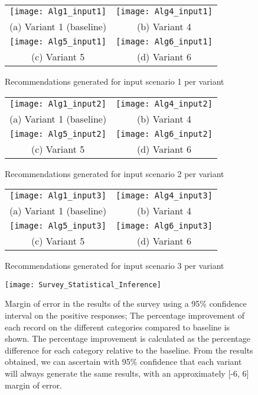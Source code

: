 \begin{figure}
\begin{tabular}{cc}
\texttt{[image: Alg1\_input1]} &  \texttt{[image: Alg4\_input1]} \\
(a) Variant 1 (baseline) & (b) Variant 4 \\[6pt]
 \texttt{[image: Alg5\_input1]} &   \texttt{[image: Alg6\_input1]} \\
(c) Variant 5 & (d) Variant 6 \\[6pt]
\end{tabular}
\caption{Recommendations generated for input scenario 1 per variant}\label{fig:input1_suggestions}
\end{figure}
\begin{figure}
\begin{tabular}{cc}
\texttt{[image: Alg1\_input2]} &  \texttt{[image: Alg4\_input2]} \\
(a) Variant 1 (baseline) & (b) Variant 4 \\[6pt]
 \texttt{[image: Alg5\_input2]} &   \texttt{[image: Alg6\_input2]} \\
(c) Variant 5 & (d) Variant 6 \\[6pt]
\end{tabular}
\caption{Recommendations generated for input scenario 2 per variant}\label{fig:input2_suggestions}
\end{figure}
\begin{figure}
\begin{tabular}{cc}
\texttt{[image: Alg1\_input3]} &  \texttt{[image: Alg4\_input3]} \\
(a) Variant 1 (baseline) & (b) Variant 4 \\[6pt]
 \texttt{[image: Alg5\_input3]} &   \texttt{[image: Alg6\_input3]} \\
(c) Variant 5 & (d) Variant 6 \\[6pt]
\end{tabular}
\caption{Recommendations generated for input scenario 3 per variant}\label{fig:input3_suggestions}
\end{figure}

\begin{figure}[htpb]
    \centering
    \texttt{[image: Survey\_Statistical\_Inference]}
    \caption[Margin of error of results using 95\% Confidence Interval with 302 records per variant]
    {Margin of error in the results of the survey using a 95\% confidence interval on the positive responses; The percentage improvement of each record on the different categories compared to baseline is shown. The percentage improvement is calculated as the percentage difference for each category relative to the baseline. From the results obtained, we can ascertain with 95\% confidence that each variant will always generate the same results, with an approximately [-6, 6] margin of error.}
    \label{fig:survey_stat_inference}
\end{figure}



